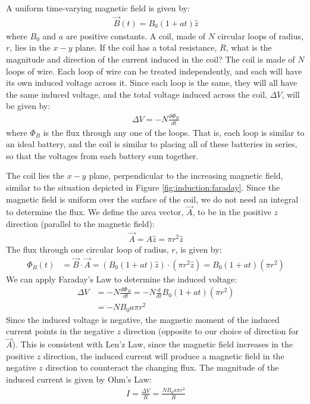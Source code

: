 \begin{example}{\label{ex:induction:changingB}A uniform time-varying magnetic field is given by:
\begin{align*}
\vec B(t) = B_0(1+at)\hat z
\end{align*}
where $B_0$ and $a$ are positive constants. A coil, made of $N$ circular loops of radius, $r$, lies in the $x-y$ plane. If the coil has a total resistance, $R$, what is the magnitude and direction of the current induced in the coil?}
The coil is made of $N$ loops of wire. Each loop of wire can be treated independently, and each will have its own induced voltage across it. Since each loop is the same, they will all have the same induced voltage, and the total voltage induced across the coil, $\Delta V$, will be given by:
\begin{align*}
\Delta V = -N \frac{d\Phi_B}{dt}
\end{align*}
where $\Phi_B$ is the flux through any one of the loops. That is, each loop is similar to an ideal battery, and the coil is similar to placing all of these batteries in series, so that the voltages from each battery sum together.

The coil lies the $x-y$ plane, perpendicular to the increasing magnetic field, similar to the situation depicted in Figure \ref{fig:induction:faraday}. Since the magnetic field is uniform over the surface of the coil, we do not need an integral to determine the flux. We define the area vector, $\vec A$, to be in the positive $z$ direction (parallel to the magnetic field):
\begin{align*}
\vec A = A \hat z = \pi r^2 \hat z
\end{align*}
The flux through one circular loop of radius, $r$, is given by:
\begin{align*}
\Phi_B (t) &= \vec B \cdot \vec A = ( B_0(1+at)\hat z) \cdot (\pi r^2 \hat z) =B_0(1+at) (\pi r^2)
\end{align*}
We can apply Faraday's Law to determine the induced voltage:
\begin{align*}
\Delta V &= -N \frac{d\Phi_B}{dt} = -N \frac{d}{dt} B_0(1+at) (\pi r^2)\\
&=-NB_0a\pi r^2
\end{align*}
Since the induced voltage is negative, the magnetic moment of the induced current points in the negative $z$ direction (opposite to our choice of direction for $\vec A$). This is consistent with Len'z Law, since the magnetic field increases in the positive $z$ direction, the induced current will produce a magnetic field in the negative $z$ direction to counteract the changing flux. The magnitude of the induced current is given by Ohm's Law:
\begin{align*}
I = \frac{\Delta V}{R}=\frac{NB_0a\pi r^2}{R}
\end{align*}


\end{example}
